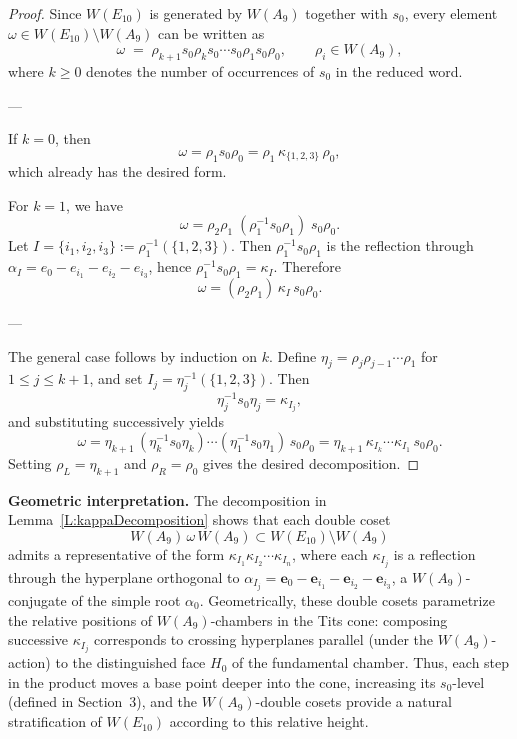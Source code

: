 \documentclass[11pt]{amsart}
\numberwithin{equation}{section}
\newcommand{\vve}{\mathbf{e}}
\begin{document}
\begin{proof}
Since $W(E_{10})$ is generated by $W(A_9)$ together with $s_0$, 
every element $\omega \in W(E_{10}) \setminus W(A_9)$ can be written as
\[
\omega \;=\; \rho_{k+1} s_0 \rho_k s_0 \cdots s_0 \rho_1 s_0 \rho_0,
\qquad \rho_i \in W(A_9),
\]
where $k\ge 0$ denotes the number of occurrences of $s_0$ in the reduced word.

---

If $k=0$, then 
\[
\omega = \rho_1 s_0 \rho_0 = \rho_1\, \kappa_{\{1,2,3\}}\, \rho_0,
\]
which already has the desired form.

For $k=1$, we have
\[
\omega 
= \rho_2 \rho_1 \; (\rho_1^{-1} s_0 \rho_1)\; s_0 \rho_0.
\]
Let $I=\{i_1,i_2,i_3\}:=\rho_1^{-1}(\{1,2,3\})$.
Then $\rho_1^{-1} s_0 \rho_1$ is the reflection through 
\(\alpha_I = e_0 - e_{i_1}-e_{i_2}-e_{i_3}\),
hence $\rho_1^{-1} s_0 \rho_1 = \kappa_I$. 
Therefore
\[
\omega = (\rho_2\rho_1)\, \kappa_I\, s_0 \rho_0.
\]

---

The general case follows by induction on $k$.  
Define $\eta_j = \rho_j \rho_{j-1}\cdots\rho_1$ for $1\le j\le k+1$, 
and set $I_j = \eta_j^{-1}(\{1,2,3\})$. 
Then
\[
\eta_j^{-1} s_0 \eta_j = \kappa_{I_j},
\]
and substituting successively yields
\[
\omega 
= \eta_{k+1}\, (\eta_k^{-1}s_0\eta_k)\cdots(\eta_1^{-1}s_0\eta_1)\, s_0\rho_0
= \eta_{k+1}\, \kappa_{I_k}\cdots\kappa_{I_1}\, s_0\rho_0.
\]
Setting $\rho_L = \eta_{k+1}$ and $\rho_R = \rho_0$ 
gives the desired decomposition.
\end{proof}


\noindent
\textbf{Geometric interpretation.}
The decomposition in Lemma~\ref{L:kappaDecomposition} shows that 
each double coset 
\[
W(A_9)\,\omega\,W(A_9) \subset W(E_{10})\setminus W(A_9)
\]
admits a representative of the form 
\(\kappa_{I_1}\kappa_{I_2}\cdots\kappa_{I_n}\),
where each \(\kappa_{I_j}\) is a reflection through the hyperplane orthogonal to
\(\alpha_{I_j}=\vve_0-\vve_{i_1}-\vve_{i_2}-\vve_{i_3}\),
a $W(A_9)$-conjugate of the simple root \(\alpha_0\).
Geometrically, these double cosets parametrize the relative positions of 
$W(A_9)$-chambers in the Tits cone: composing successive $\kappa_{I_j}$ corresponds
to crossing hyperplanes parallel (under the $W(A_9)$-action) to the distinguished face
$H_0$ of the fundamental chamber.
Thus, each step in the product 
moves a base point deeper into the cone, increasing its 
$s_0$-level (defined in Section~3),
and the $W(A_9)$-double cosets provide a natural stratification of 
$W(E_{10})$ according to this relative height.
\end{document}
